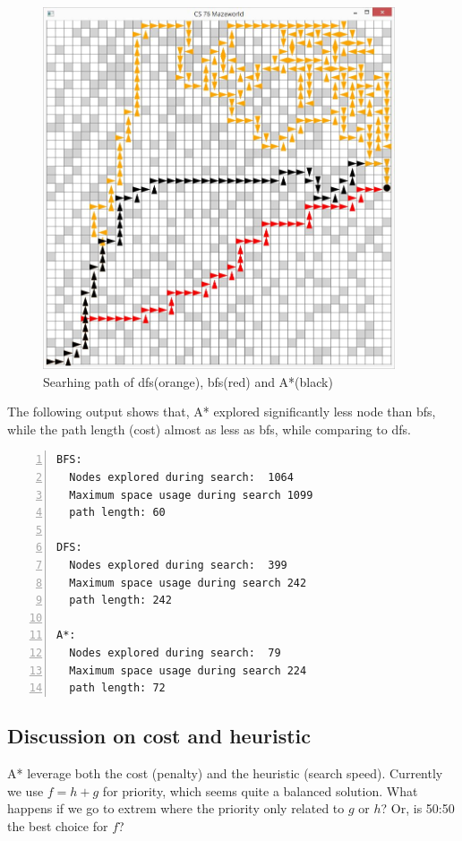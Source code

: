 \begin{figure}[!h]
\centering
\includegraphics[width=0.927\textwidth]{s-1-1.JPG}
\caption{Searhing path of dfs(orange), bfs(red) and A*(black)}
\label{s-1}
\end{figure}

The following output shows that, A* explored significantly less node than bfs, while the path length (cost) almost as less as bfs, while comparing to dfs.



\begin{lstlisting}[numbers=left]
BFS:  
  Nodes explored during search:  1064
  Maximum space usage during search 1099
  path length: 60
  
DFS:  
  Nodes explored during search:  399
  Maximum space usage during search 242
  path length: 242
  
A*:  
  Nodes explored during search:  79
  Maximum space usage during search 224
  path length: 72
\end{lstlisting}







\subsection{Discussion on cost and heuristic}
A* leverage both the cost (penalty) and the heuristic (search speed). Currently we use $f = h + g$ for priority, which seems quite a balanced solution. What happens if we go to extrem where the priority only related to $g$ or $h$? Or, is 50:50 the best choice for $f$?

